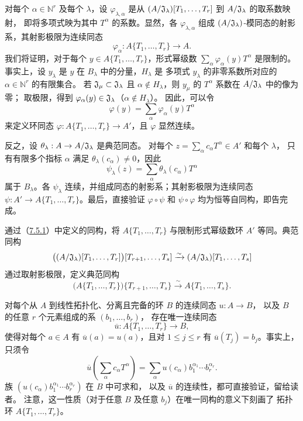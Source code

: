 对每个 $\alpha\in\mathbb N^r$ 及每个 $\lambda$，设 $\varphi_{\lambda,\alpha}$ 是从
$(A/\mathfrak J_\lambda)[T_1,\ldots,T_r]$ 到 $A/\mathfrak J_\lambda$ 的取系数映射，
即将多项式映为其中 $T^\alpha$ 的系数。显然，各 $\varphi_{\lambda,\alpha}$
组成 $(A/\mathfrak J_\lambda)$-模同态的射影系，其射影极限为连续同态
\[
 \varphi_\alpha:A\{T_1,\ldots,T_r\}\longrightarrow A.
\]
我们将证明，对于每个 $y\in A\{T_1,\ldots,T_r\}$，形式幂级数
$\sum_\alpha\varphi_\alpha(y)T^\alpha$ 是限制的。
事实上，设 $y_\lambda$ 是 $y$ 在 $B_\lambda$ 中的分量，$H_\lambda$ 是
多项式 $y_\lambda$ 的非零系数所对应的 $\alpha\in\mathbb N^r$ 的有限集合。
若 $\mathfrak J_\mu\subset\mathfrak J_\lambda$ 且 $\alpha\notin H_\lambda$，则
$y_\mu$ 的 $T^\alpha$ 系数在 $A/\mathfrak J_\lambda$ 中的像为零；
取极限，得到 $\varphi_\alpha(y)\in\mathfrak J_\lambda$（$\alpha\notin H_\lambda$）。
因此，可以令
\[
 \varphi(y)=\sum_\alpha\varphi_\alpha(y)T^\alpha
\]
来定义环同态 $\varphi:A\{T_1,\ldots,T_r\}\to A'$，且 $\varphi$ 显然连续。

反之，设 $\theta_\lambda:A\to A/\mathfrak J_\lambda$ 是典范同态。
对每个 $z=\sum_\alpha c_\alpha T^\alpha\in A'$ 和每个 $\lambda$，
只有有限多个指标 $\alpha$ 满足 $\theta_\lambda(c_\alpha)\ne0$，因此
\[
 \psi_\lambda(z)=\sum_\alpha\theta_\lambda(c_\alpha)T^\alpha
\]
属于 $B_\lambda$。各 $\psi_\lambda$ 连续，并组成同态的射影系；其射影极限为连续同态
$\psi:A'\to A\{T_1,\ldots,T_r\}$。最后，直接验证
$\varphi\circ\psi$ 和 $\psi\circ\varphi$ 均为恒等自同构，即告完成。

通过（\hyperlink{para:0:7.5.1}{7.5.1}）中定义的同构，将 $A\{T_1,\ldots,T_r\}$ 与限制形式幂级数环
$A'$ 等同。典范同构
\[
 \bigl((A/\mathfrak J_\lambda)[T_1,\ldots,T_r]\bigr)[T_{r+1},\ldots,T_s]
 \xrightarrow{\sim}(A/\mathfrak J_\lambda)[T_1,\ldots,T_s]
\]
通过取射影极限，定义典范同构
\[
 \bigl(A\{T_1,\ldots,T_r\}\bigr)\{T_{r+1},\ldots,T_s\}
 \xrightarrow{\sim} A\{T_1,\ldots,T_s\}.
\]

对每个从 $A$ 到线性拓扑化、分离且完备的环 $B$ 的连续同态 $u:A\to B$，
以及 $B$ 的任意 $r$ 个元素组成的系 $(b_1,\ldots,b_r)$，
存在唯一连续同态
\[
 \overline u:A\{T_1,\ldots,T_r\}\longrightarrow B,
\]
使得对每个 $a\in A$ 有 $\overline u(a)=u(a)$，且对 $1\leq j\leq r$
有 $\overline u(T_j)=b_j$。事实上，只须令
\[
 \overline u\left(\sum_\alpha c_\alpha T^\alpha\right)
 =\sum_\alpha u(c_\alpha)b_1^{\alpha_1}\cdots b_r^{\alpha_r}.
\]
族 $(u(c_\alpha)b_1^{\alpha_1}\cdots b_r^{\alpha_r})$ 在 $B$ 中可求和，
以及 $\overline u$ 的连续性，都可直接验证，留给读者。
注意，这一性质（对于任意 $B$ 及任意 $b_j$）在唯一同构的意义下刻画了
拓扑环 $A\{T_1,\ldots,T_r\}$。

